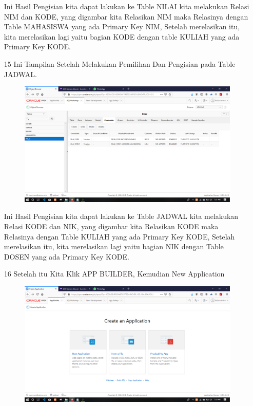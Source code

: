 \begin{enumerate}
\par
Ini Hasil Pengisian kita dapat lakukan ke Table NILAI kita melakukan Relasi NIM dan KODE, yang digambar kita Relasikan NIM maka Relasinya dengan Table MAHASISWA yang ada Primary Key NIM, Setelah merelasikan itu, kita merelasikan lagi yaitu bagian KODE dengan table KULIAH yang ada Primary Key KODE.

\newpage
\item[15]Ini Tampilan Setelah Melakukan Pemilihan Dan Pengisian pada Table JADWAL.

\begin{figure}[!htbp]
    \begin{center}
    \includegraphics[scale=0.2]{figures/19.png}
    \end{center}   
    \end{figure}
    
\par
Ini Hasil Pengisian kita dapat lakukan ke Table JADWAL kita melakukan Relasi KODE dan NIK, yang digambar kita Relasikan KODE maka Relasinya dengan Table KULIAH yang ada Primary Key KODE, Setelah merelasikan itu, kita merelasikan lagi yaitu bagian NIK dengan Table DOSEN yang ada Primary Key KODE.

\item[16]Setelah itu Kita Klik APP BUILDER, Kemudian New Application

\begin{figure}[!htbp]
    \begin{center}
    \includegraphics[scale=0.2]{figures/20.png}
    \end{center}   
    \end{figure}
    

\end{enumerate}
